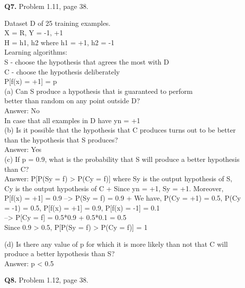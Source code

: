 \documentclass[12pt]{article}
\begin{document}
\begin{enumerate}
\pagebreak

\item [\textbf{Q7.}] Problem 1.11, page 38.
	\begin{addmargin}[1em]{2em}%
		Dataset D of 25 training examples.\\
		X = R, Y = {-1, +1}\\
		H = {h1, h2} where h1 = +1, h2 = -1\\
		Learning algorithms:\\
		S - choose the hypothesis that agrees the most with D\\
		C - choose the hypothesis deliberately\\
		P[f(x) = +1] = p\\
		(a) Can S produce a hypothesis that is guaranteed to perform\\ better than random on any point outside D?\\
		Answer: No\\
		In case that all examples in D have yn = +1\\
		(b) Is it possible that the hypothesis that C produces turns out
		 to be better than the hypothesis that S produces?\\
		Answer: Yes\\
		(c) If p = 0.9, what is the probability that S will produce a better hypothesis than C?\\
		Answer: P[P(Sy = f) > P(Cy = f)] where Sy is the output hypothesis of S, Cy is the output hypothesis of C
+ Since yn = +1, Sy = +1. Moreover, P[f(x) = +1] = 0.9 --> P(Sy = f) = 0.9
+ We have, P(Cy = +1) = 0.5, P(Cy = -1) = 0.5, P[f(x) = +1] = 0.9, P[f(x) = -1] = 0.1\\
		--> P[Cy = f] = 0.5*0.9 + 0.5*0.1 = 0.5\\
		Since 0.9 > 0.5, P[P(Sy = f) > P(Cy = f)] = 1

		(d) Is there any value of p for which it is more likely than not that C will produce a better hypothesis than S?\\
		Answer: p < 0.5
	\end{addmargin}

\item [\textbf{Q8.}] Problem 1.12, page 38.


\end{enumerate}
\end{document}
